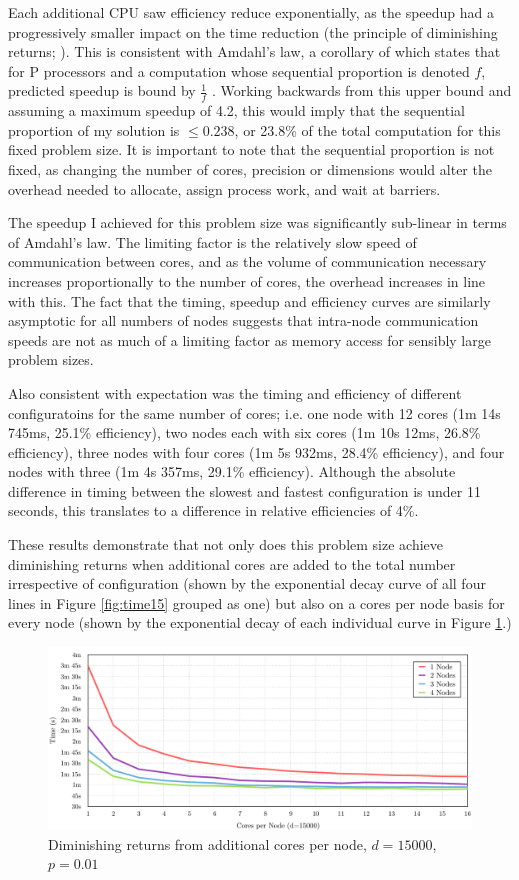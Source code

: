 \documentclass[12pt]{article}
\begin{document}
Each additional CPU saw efficiency reduce exponentially, as the speedup had a progressively smaller impact on the time reduction (the principle of diminishing returns; \citep{Amdahl}). This is consistent with Amdahl's law, a corollary of which states that for P processors and a computation whose sequential proportion is denoted $f$, predicted speedup is bound by $\frac{1}{f}$ \citep{springer}. Working backwards from this upper bound and assuming a maximum speedup of 4.2, this would imply that the sequential proportion of my solution is $\leq 0.238$, or 23.8\% of the total computation for this fixed problem size. It is important to note that the sequential proportion is not fixed, as changing the number of cores, precision or dimensions would alter the overhead needed to allocate, assign process work, and wait at barriers.

The speedup I achieved for this problem size was significantly sub-linear in terms of Amdahl's law. The limiting factor is the relatively slow speed of communication between cores, and as the volume of communication necessary increases proportionally to the number of cores, the overhead increases in line with this. The fact that the timing, speedup and efficiency curves are similarly asymptotic for all numbers of nodes suggests that intra-node communication speeds are not as much of a limiting factor as memory access for sensibly large problem sizes.

Also consistent with expectation was the timing and efficiency of different configuratoins for the same number of cores; i.e. one node with 12 cores (1m 14s 745ms, 25.1\% efficiency), two nodes each with six cores (1m 10s 12ms, 26.8\% efficiency), three nodes with four cores (1m 5s 932ms, 28.4\% efficiency), and four nodes with three (1m 4s 357ms, 29.1\% efficiency). Although the absolute difference in timing between the slowest and fastest configuration is under 11 seconds, this translates to a difference in relative efficiencies of 4\%.

These results demonstrate that not only does this problem size achieve diminishing returns when additional cores are added to the total number irrespective of configuration (shown by the exponential decay curve of all four lines in Figure \ref{fig:time15} grouped as one) but also on a cores per node basis for every node (shown by the exponential decay of each individual curve in Figure \ref{fig:cpn}.)
\begin{figure}[htbp!]
        \centering\includegraphics[width=\textwidth]{img/cpn.pdf}
        \caption{Diminishing returns from additional cores per node, $d=15000$, $p=0.01$}
        \label{fig:cpn}
\end{figure}
\end{document}
